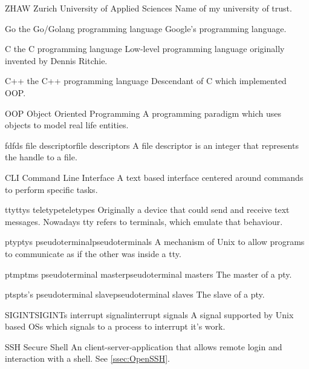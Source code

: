 
%
{ZHAW}{}%
{Zurich University of Applied Sciences}{}%
{Name of my university of trust.}

%
{Go}{}%
{the Go/Golang programming language}{}%
{Google's programming language.}

%
{C}{}%
{the C programming language}{}%
{Low-level programming language originally invented by Dennis Ritchie.}

%
{C++}{}%
{the C++ programming language}{}%
{Descendant of \gls{C} which implemented \gls{OOP}.}

%
{OOP}{}%
{Object Oriented Programming}{}%
{A programming paradigm which uses objects to model real life entities.}

%
{fd}{fds}%
{file descriptor}{file descriptors}%
{A file descriptor is an integer that represents the handle to a file.}

%
{CLI}{}%
{Command Line Interface}{}%
{A text based interface centered around commands to perform specific tasks.}

%
{tty}{ttys}%
{teletype}{teletypes}%
{Originally a device that could send and receive text messages. Nowadays \gls{tty} refers to \glspl{terminal}, which emulate that behaviour\citep{tty}.}

%
{pty}{ptys}%
{pseudoterminal}{pseudoterminals}%
{A mechanism of \gls{Unix} to allow programs to communicate as if the other was inside a \gls{tty}\citep{pty}.}

%
{ptm}{ptms}%
{pseudoterminal master}{pseudoterminal masters}%
{The master of a \gls{pty}.}

%
{pts}{pts's}%
{pseudoterminal slave}{pseudoterminal slaves}%
{The slave of a \gls{pty}\citep{pts}.}

%
{SIGINT}{SIGINTs}%
{interrupt signal}{interrupt signals}%
{A signal supported by \gls{Unix} based \glspl{OS} which signals to a process to interrupt it's work.}

%
{SSH}{}%
{Secure Shell}{}%
{An client-server-application that allows remote login and interaction with a \gls{shell}. See \ref{ssec:OpenSSH}.}

